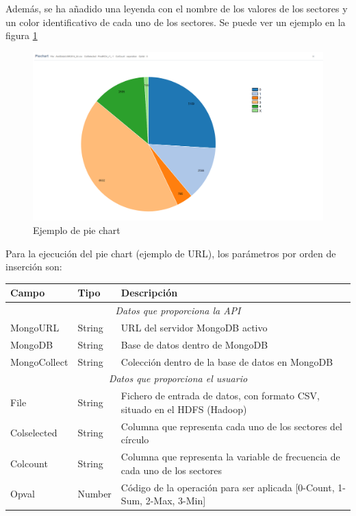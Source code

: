 Además, se ha añadido una leyenda con el nombre de los valores de los sectores y un color identificativo de cada uno de los sectores. Se puede ver un ejemplo en la figura \ref{fig:ejemplopiechart}
\begin{figure}
	\centering
	\includegraphics[width=1\linewidth]{imagenes/ejemplo_piechart}
	\caption{Ejemplo de pie chart}
	\label{fig:ejemplopiechart}
\end{figure}

Para la ejecución del pie chart (ejemplo de URL\footnotemark), los parámetros por orden de inserción son:

\begin{tabular}{|l|l|p{7cm}|}
	\hline 
	\textbf{Campo} & \textbf{Tipo} & \textbf{Descripción} \\ 
	\hline \hline
	\multicolumn{3}{|c|}{\textit{Datos que proporciona la API}} \\
	\hline 
	MongoURL & String & URL del servidor MongoDB activo \\ 
	\hline 
	MongoDB & String & Base de datos dentro de MongoDB \\ 
	\hline 
	MongoCollect& String & Colección dentro de la base de datos en MongoDB \\ 
	\hline \hline
	\multicolumn{3}{|c|}{\textit{Datos que proporciona el usuario}} \\
	\hline 
	File & String & Fichero de entrada de datos, con formato CSV, situado en el HDFS (Hadoop) \\ 
	\hline 
	Colselected & String & Columna que representa cada uno de los sectores del círculo \\ 
	\hline 
	Colcount & String & Columna que representa la variable de frecuencia de cada uno de los sectores \\ 
	\hline 
	Opval & Number & Código de la operación para ser aplicada [0-Count, 1-Sum, 2-Max, 3-Min] \\ 
	\hline  
\end{tabular} 

